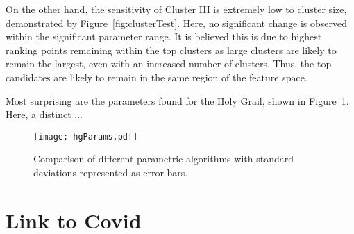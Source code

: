 On the other hand, the sensitivity of Cluster III is extremely low to cluster size, demonstrated by Figure~\ref{fig:clusterTest}. Here, no significant change is observed within the significant parameter range. It is believed this is due to highest ranking points remaining within the top clusters as large clusters are likely to remain the largest, even with an increased number of clusters. Thus, the top candidates are likely to remain in the same region of the feature space.

Most surprising are the parameters found for the Holy Grail, shown in Figure~\ref{fig:paramHg}. Here, a distinct ...

\begin{figure}[h]
    \begin{center}
        \texttt{[image: hgParams.pdf]}
        \caption[Non-parametric comparison]{Comparison of different parametric algorithms with standard deviations represented as error bars.}
        \label{fig:paramHg}
    \end{center}
\end{figure}

\section{Link to Covid}
\blindtext[1]
